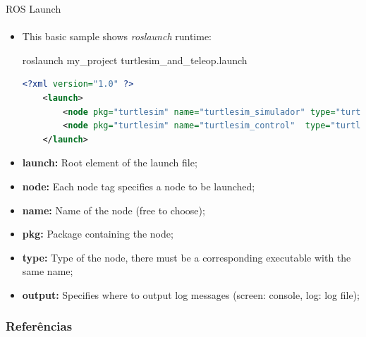 \documentclass[aspectratio=169]{beamer}
\begin{document}
\begin{frame}[fragile]{ROS Launch}
	\framesubtitle{}

	\begin{itemize}
		\item This basic sample shows \textit{roslaunch} runtime:
	
	\begin{block}{roslaunch my\_project turtlesim\_and\_teleop.launch}
		\begin{lstlisting}[language=XML]
	<?xml version="1.0" ?>
	<launch>
		<node pkg="turtlesim" name="turtlesim_simulador" type="turtlesim_node"></node>
		<node pkg="turtlesim" name="turtlesim_control"  type="turtle_teleop_key"></node>
	</launch>
		\end{lstlisting}
	\end{block}

		\item \textbf{launch:} Root element of the launch file;
		\item \textbf{node:} Each node tag specifies a node to be launched;
		\item \textbf{name:} Name of the node (free to choose);
		\item \textbf{pkg:} Package containing the node;
		\item \textbf{type:} Type of the node, there must be a corresponding executable with the same name;
		\item \textbf{output:} Specifies where to output log messages (screen: console, log: log file);
	
	\end{itemize}

\end{frame}


\begin{frame}[t, allowframebreaks]
	\frametitle{Referências}
	
\end{frame}
\end{document}
